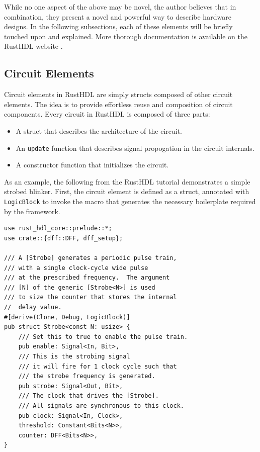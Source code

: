 \documentclass[conference]{IEEEtran}
\begin{document}
While no one aspect of the above may be novel, the author believes that in combination, they present a 
novel and powerful way to describe hardware designs.  In the following subsections, each of these 
elements will be briefly touched upon and explained.  More thorough documentation is available on the
RustHDL website \cite{b6}.

\subsection{Circuit Elements}

Circuit elements in RustHDL are simply structs composed of other circuit elements.  The idea is to
provide effortless reuse and composition of circuit components.  Every circuit in RustHDL is composed
of three parts:
\begin{itemize}
  \item A struct that describes the architecture of the circuit.
  \item An \verb|update| function that describes signal propogation in the circuit internals.
  \item A constructor function that initializes the circuit.
\end{itemize}

As an example, the following from the RustHDL tutorial demonstrates a simple strobed blinker.  First, the
circuit element is defined as a struct, annotated with \verb|LogicBlock| to invoke the macro that generates
the necessary boilerplate required by the framework.

\begin{verbatim}
use rust_hdl_core::prelude::*;
use crate::{dff::DFF, dff_setup};

/// A [Strobe] generates a periodic pulse train, 
/// with a single clock-cycle wide pulse
/// at the prescribed frequency.  The argument 
/// [N] of the generic [Strobe<N>] is used
/// to size the counter that stores the internal 
//  delay value.  
#[derive(Clone, Debug, LogicBlock)]
pub struct Strobe<const N: usize> {
    /// Set this to true to enable the pulse train.
    pub enable: Signal<In, Bit>,
    /// This is the strobing signal 
    /// it will fire for 1 clock cycle such that 
    /// the strobe frequency is generated.
    pub strobe: Signal<Out, Bit>,
    /// The clock that drives the [Strobe].  
    /// All signals are synchronous to this clock.
    pub clock: Signal<In, Clock>,
    threshold: Constant<Bits<N>>,
    counter: DFF<Bits<N>>,
}
\end{verbatim}
\end{document}

